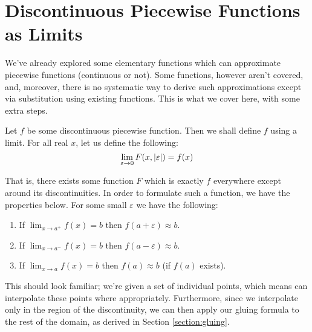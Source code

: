 \section{Discontinuous Piecewise Functions as Limits}
We've already explored some elementary functions which can approximate piecewise functions (continuous or not). Some functions, however aren't covered, and, moreover, there is no systematic way to derive such approximations except via substitution using existing functions. This is what we cover here, with some extra steps.

Let $f$ be some discontinuous piecewise function. Then we shall define $f$ using a limit. For all real $x$, let us define the following:
$$
    \lim_{\varepsilon\to0}{F(x,\abs{\varepsilon})}=f(x)
$$

That is, there exists some function $F$ which is exactly $f$ everywhere except around its discontinuities. In order to formulate such a function, we have the properties below. For some small $\varepsilon$ we have the following:

\begin{enumerate}
    \item If $\lim_{x\to a^+}{f(x)}=b$ then $f(a+\varepsilon)\approx b$.
    \item If $\lim_{x\to a^-}{f(x)}=b$ then $f(a-\varepsilon)\approx b$.
    \item If $\lim_{x\to a}{f(x)}=b$ then $f(a)\approx b$ (if $f(a)$ exists).
\end{enumerate}

This should look familiar; we're given a set of individual points, which means can interpolate these points where appropriately. Furthermore, since we interpolate only in the region of the discontinuity, we can then apply our gluing formula to the rest of the domain, as derived in Section \ref{section:gluing}.


